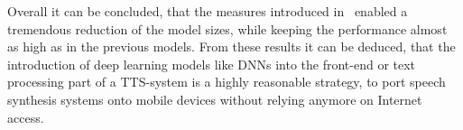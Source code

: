 Overall it can be concluded, that the measures introduced in~\cite{boros:robust} enabled a tremendous reduction of the model sizes, while keeping the performance almost as high as in the previous models. From these results it can be deduced, that the introduction of deep learning models like \acp{DNN} into the front-end or text processing part of a \ac{TTS}-system is a highly reasonable strategy, to port speech synthesis systems onto mobile devices without relying anymore on Internet access.